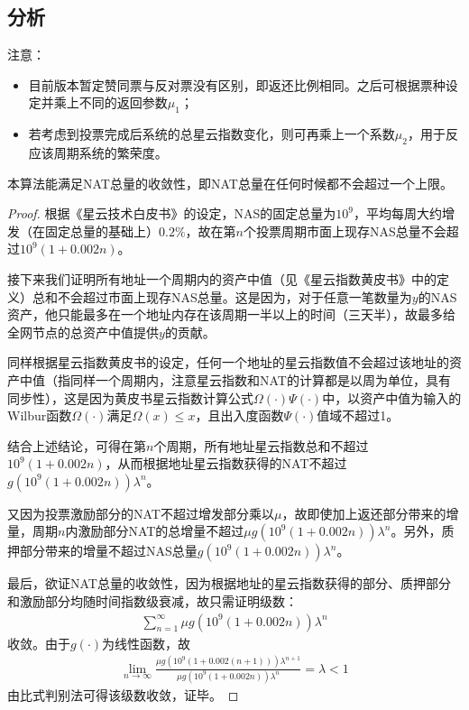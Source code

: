 \subsection{分析}

注意：
\begin{itemize}
\item 目前版本暂定赞同票与反对票没有区别，即返还比例相同。之后可根据票种设定并乘上不同的返回参数$\mu_1$；
\item 若考虑到投票完成后系统的总星云指数变化，则可再乘上一个系数$\mu_2$，用于反应该周期系统的繁荣度。
\end{itemize}


\begin{property}
本算法能满足NAT总量的收敛性，即NAT总量在任何时候都不会超过一个上限。
\end{property}
\begin{proof}
	根据《星云技术白皮书》的设定，NAS的固定总量为$10^9$，平均每周大约增发（在固定总量的基础上）$0.2\%$，故在第$n$个投票周期市面上现存NAS总量不会超过$10^9(1+0.002n)$。
	
	接下来我们证明所有地址一个周期内的资产中值（见《星云指数黄皮书》中的定义）总和不会超过市面上现存NAS总量。这是因为，对于任意一笔数量为$y$的NAS资产，他只能最多在一个地址内存在该周期一半以上的时间（三天半），故最多给全网节点的总资产中值提供$y$的贡献。
	
	同样根据星云指数黄皮书的设定，任何一个地址的星云指数值不会超过该地址的资产中值（指同样一个周期内，注意星云指数和NAT的计算都是以周为单位，具有同步性），这是因为黄皮书星云指数计算公式$\Omega(\cdot)\Psi(\cdot)$中，以资产中值为输入的Wilbur函数$\Omega(\cdot)$满足$\Omega(x)\leq x$，且出入度函数$\Psi(\cdot)$值域不超过1。
	
	结合上述结论，可得在第$n$个周期，所有地址星云指数总和不超过$10^9(1+0.002n)$，从而根据地址星云指数获得的NAT不超过$g(10^9(1+0.002n))\lambda^n$。
	
	又因为投票激励部分的NAT不超过增发部分乘以$\mu$，故即使加上返还部分带来的增量，周期$n$内激励部分NAT的总增量不超过$\mu g(10^9(1+0.002n))\lambda^n$。另外，质押部分带来的增量不超过NAS总量$g(10^9(1+0.002n))\lambda^n$。
	
	最后，欲证NAT总量的收敛性，因为根据地址的星云指数获得的部分、质押部分和激励部分均随时间指数级衰减，故只需证明级数：
	\begin{align}
	\sum_{n=1}^{\infty} \mu g(10^9(1+0.002n))\lambda^n
	\end{align}
	收敛。由于$g(\cdot)$为线性函数，故
	\begin{align}
	\lim_{n\rightarrow \infty} \frac{\mu g(10^9(1+0.002(n+1)))\lambda^{n+1}}{\mu g(10^9(1+0.002n))\lambda^n} = \lambda <1
	\end{align}
	由比式判别法可得该级数收敛，证毕。
\end{proof}
